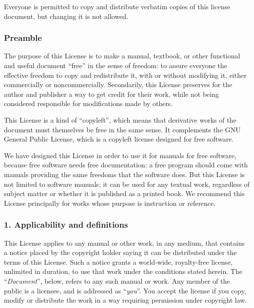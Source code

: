 \documentclass[a4paper,openany]{book}
\begin{document}
 \bigskip

 Everyone is permitted to copy and distribute verbatim copies
 of this license document, but changing it is not allowed.

\begin{results}
\tiny

\subsubsection*{Preamble}

The purpose of this License is to make a manual, textbook, or other
functional and useful document ``free'' in the sense of freedom: to
assure everyone the effective freedom to copy and redistribute it,
with or without modifying it, either commercially or noncommercially.
Secondarily, this License preserves for the author and publisher a way
to get credit for their work, while not being considered responsible
for modifications made by others.

This License is a kind of ``copyleft'', which means that derivative
works of the document must themselves be free in the same sense. It
complements the GNU General Public License, which is a copyleft
license designed for free software.

We have designed this License in order to use it for manuals for free
software, because free software needs free documentation: a free
program should come with manuals providing the same freedoms that the
software does. But this License is not limited to software manuals;
it can be used for any textual work, regardless of subject matter or
whether it is published as a printed book. We recommend this License
principally for works whose purpose is instruction or reference.

\subsubsection*{1. Applicability and definitions}

This License applies to any manual or other work, in any medium, that
contains a notice placed by the copyright holder saying it can be
distributed under the terms of this License. Such a notice grants a
world-wide, royalty-free license, unlimited in duration, to use that
work under the conditions stated herein. The ``\emph{Document}'', below,
refers to any such manual or work. Any member of the public is a
licensee, and is addressed as ``\emph{you}''. You accept the license if you
copy, modify or distribute the work in a way requiring permission
under copyright law.


\end{results}
\end{document}
